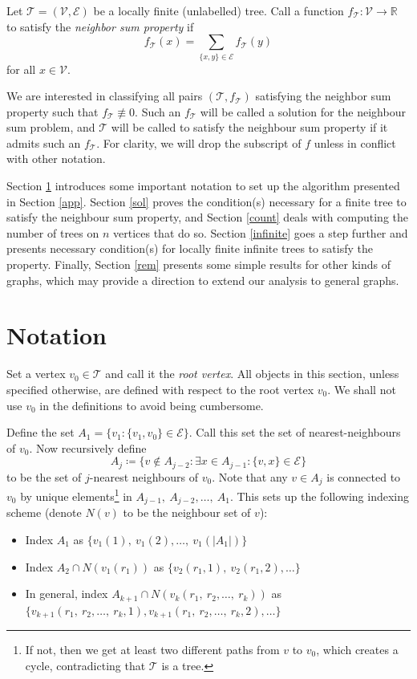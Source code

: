 \documentclass[11pt]{article}
\begin{document}
Let $\mathcal{T} = (\mathcal V, \mathcal E)$ be a locally finite (unlabelled) tree. Call a function $f_{\mathcal T} : \mathcal V \to \mathbb R$ to satisfy the \textit{neighbor sum property} if
\[f_{\mathcal T}(x) = \sum_{\{x,y\}\in\mathcal E}f_{\mathcal T}(y)\]
for all $x\in \mathcal V$.

We are interested in classifying all pairs $(\mathcal T, f_{\mathcal{T}})$ satisfying the neighbor sum property such that $f_{\mathcal T}\not\equiv 0$. Such an $f_{\mathcal T}$ will be called a solution for the neighbour sum problem, and $\mathcal{T}$ will be called to satisfy the neighbour sum property if it admits such an $f_{\mathcal T}$. For clarity, we will drop the subscript of $f$ unless in conflict with other notation.

Section \ref{Not} introduces some important notation to set up the algorithm presented in Section \ref{app}. Section \ref{sol} proves the condition(s) necessary for a finite tree to satisfy the neighbour sum property, and Section \ref{count} deals with computing the number of trees on $n$ vertices that do so. Section \ref{infinite} goes a step further and presents necessary condition(s) for locally finite infinite trees to satisfy the property. Finally, Section \ref{rem} presents some simple results for other kinds of graphs, which may provide a direction to extend our analysis to general graphs.

\section{Notation}\label{Not}
Set a vertex $v_0\in \mathcal{T}$ and call it the \textit{root vertex}. All objects in this section, unless specified otherwise, are defined with respect to the root vertex $v_0$. We shall not use $v_0$ in the definitions to avoid being cumbersome. 

Define the set $A_1=\{v_1: \{v_1, v_0\}\in \mathcal{E}\}$. Call this set the set of nearest-neighbours of $v_0$. Now recursively define
$$A_j \coloneqq \{v\notin A_{j-2} : \exists x \in A_{j-1} : \{v,x\}\in \mathcal E\}$$
to be the set of $j$-nearest neighbours of $v_0$. Note that any $v\in A_j$ is connected to $v_0$ by unique elements\footnote{If not, then we get at least two different paths from $v$ to $v_0$, which creates a cycle, contradicting that $\mathcal T$ is a tree.} in $A_{j-1},\:A_{j-2},\ldots,\:A_1$. This sets up the following indexing scheme (denote $N(v)$ to be the neighbour set of $v$):\begin{itemize}

    \item Index $A_1$ as $\{v_1(1),\: v_1(2),\ldots,\:v_1(|A_1|)\}$
    \item Index $A_2\cap N(v_1(r_1))$ as $\{v_2(r_1, 1),\: v_2(r_1, 2),\ldots\}$
    \item In general, index $A_{k+1}\cap N(v_k(r_1,\: r_2,\ldots,\: r_k))$ as $\{v_{k+1}(r_1,\:r_2,\ldots,\:r_k,1), v_{k+1}(r_1,\:r_2,\ldots,\:r_k,2),\ldots\}$
\end{itemize}
\end{document}
